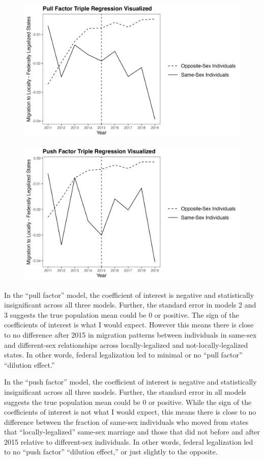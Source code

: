 \documentclass[12pt,letterpaper]{article}
\begin{document}
\begin{figure}[h]
    \centering
    \includegraphics[width=0.75\linewidth]{outputs/summary_stats/post_diffs.png}
    \caption{}
    \label{fig: post_diffs}
\end{figure}

\begin{figure}[h]
    \centering
    \includegraphics[width=0.75\linewidth]{outputs/summary_stats/ante_diffs.png}
    \caption{}
    \label{fig: ante_diffs}
\end{figure}

In the “pull factor” model, the coefficient of interest is negative and statistically insignificant across all three models. Further, the standard error in models 2 and 3 suggests the true population mean could be 0 or positive. The sign of the coefficients of interest is what I would expect. However this means there is close to no difference after 2015 in migration patterns between individuals in same-sex and different-sex relationships across locally-legalized and not-locally-legalized states. In other words, federal legalization led to minimal or no “pull factor” “dilution effect.” 

In the “push factor” model, the coefficient of interest is negative and statistically insignificant across all three models. Further, the standard error in all models suggests the true population mean could be 0 or positive. While the sign of the coefficients of interest is not what I would expect, this means there is close to no difference between the fraction of same-sex individuals who moved from states that “locally-legalized” same-sex marriage and those that did not before and after 2015 relative to different-sex individuals. In other words, federal legalization led to no “push factor” “dilution effect,” or just slightly to the opposite.  
\end{document}
